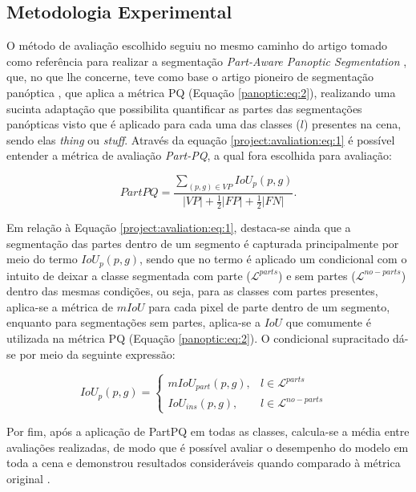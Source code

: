 \subsection{Metodologia Experimental}
\label{project:exp_result}
O método de avaliação escolhido seguiu no mesmo caminho do artigo tomado como referência para realizar a segmentação \textit{Part-Aware Panoptic Segmentation} \cite{DeGeus2021}, que, no que lhe concerne, teve como base o artigo pioneiro de segmentação panóptica \cite{Kirillov2019a}, que aplica a métrica PQ (Equação \ref{panoptic:eq:2}), realizando uma sucinta adaptação que possibilita quantificar as partes das segmentações panópticas visto que é aplicado para cada uma das classes ($l$) presentes na cena, sendo elas \textit{thing} ou \textit{stuff}. Através da equação \ref{project:avaliation:eq:1} é possível entender a métrica de avaliação \textit{Part-PQ}, a qual fora escolhida para avaliação:

\begin{equation}
\label{project:avaliation:eq:1}
    PartPQ = \frac{\sum _{(p,g) \in VP} IoU_p(p,g)}{|VP|+ \frac{1}{2}|FP| + \frac{1}{2}|FN|}.
\end{equation}

Em relação à Equação \ref{project:avaliation:eq:1}, destaca-se ainda que a segmentação das partes dentro de um segmento é capturada principalmente por meio do termo $IoU_p(p,g)$, sendo que no termo é aplicado um condicional com o intuito de deixar a classe segmentada com parte ($\mathcal{L}^{parts}$) e sem partes ($\mathcal{L}^{no-parts}$) dentro das mesmas condições, ou seja, para as classes com partes presentes, aplica-se a métrica de $mIoU$ para cada pixel de parte dentro de um segmento, enquanto para segmentações sem partes, aplica-se a $IoU$ que comumente é utilizada na métrica PQ (Equação \ref{panoptic:eq:2}). O condicional supracitado dá-se por meio da seguinte expressão:

\begin{equation}
\label{project:avaliation:eq:2}
    IoU_p(p,g)= \left\{\begin{matrix}
        mIoU_{part}(p,g), & l \in \mathcal{L}^{parts}    & \\ 
        IoU_{ins}(p,g),        & l \in \mathcal{L}^{no-parts} & 
    \end{matrix}\right.
\end{equation}

Por fim, após a aplicação de PartPQ em todas as classes, calcula-se a média entre avaliações realizadas, de modo que é possível avaliar o desempenho do modelo em toda a cena e demonstrou resultados consideráveis quando comparado à métrica original \cite{DeGeus2021}.


